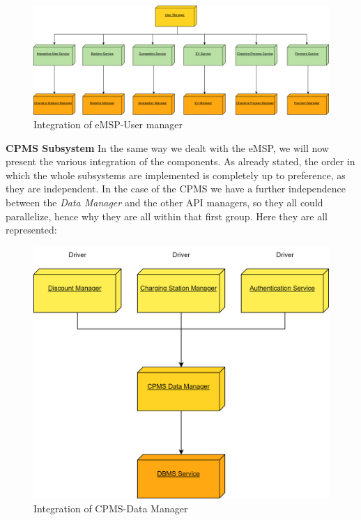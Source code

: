 \documentclass[table, 12pt]{article}
\begin{document}
\begin{figure}[H]
    \centering
    \includegraphics[scale=0.6]{assets/Integration Diagrams/eMSP-User Manager.png} 
    \caption{Integration of eMSP-User manager}%
    \label{fig: eMSP-User manager}%
\end{figure}

\newpage
\textbf{CPMS Subsystem} \newline
In the same way we dealt with the eMSP, we will now present the various integration of the components. As already stated, the order in which the whole subsystems are implemented is 
completely up to preference, as they are independent. \newline
In the case of the CPMS we have a further independence between the \emph{Data Manager} and the other API managers, so they all could parallelize, hence why they are all within that first group.
Here they are all represented:

\begin{figure}[H]
    \centering
    \includegraphics[scale=0.6]{assets/Integration Diagrams/CPMS-Data Manager.png} 
    \caption{Integration of CPMS-Data Manager}%
    \label{fig: CPMS-Data manager}%
\end{figure}
\end{document}
